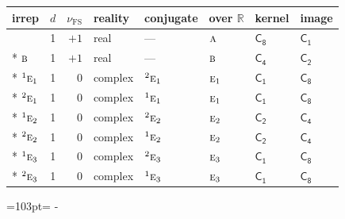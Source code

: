 \documentclass[10pt,a4paper]{article}
\newcommand{\needspace}[1]{\par\penalty-100\begingroup\dimen0=#1\relax\dimen2=\pagegoal
  \advance\dimen2-\pagetotal\ifdim\dimen0>\dimen2\relax\ifdim\dimen2>0pt\vfil\break\fi\fi
  \endgroup}
\numberwithin{equation}{section}
\newcommand{\grp}[1]{\mathsf{#1}}
\newcommand{\irr}[1]{\text{\normalfont\scshape #1}}
\newcommand{\conjpair}[1]{{}^{#1}}
\newcommand{\detbox}[1]{{\setlength{\fboxsep}{1pt}\fbox{#1}}}
\newcommand{\fsind}{\nu_{\mathrm{FS}}}
\begin{document}
{\small\renewcommand{\arraystretch}{1.25}\setlength{\tabcolsep}{4pt}\begin{longtable}{@{}lrrlllll@{}}\toprule
irrep & $d$ & $\fsind$ & reality & conjugate & over $\mathbb{R}$ & kernel & image\\\midrule\endhead
\bottomrule\endfoot\endlastfoot
\detbox{$\irr{a}$} & 1 & $+1$ & real & --- & $\irr{a}$ & \href{C8.pdf}{$\grp{C_{8}}$} & \href{C1.pdf}{$\grp{C_{1}}$}\\*
$\irr{b}$ & 1 & $+1$ & real & --- & $\irr{b}$ & \href{C4.pdf}{$\grp{C_{4}}$} & \href{C2.pdf}{$\grp{C_{2}}$}\\*
$\conjpair{1}\irr{e}_{1}$ & 1 & $0$ & complex & $\conjpair{2}\irr{e}_{1}$ & $\irr{e}_{1}$ & \href{C1.pdf}{$\grp{C_{1}}$} & \href{C8.pdf}{$\grp{C_{8}}$}\\*
$\conjpair{2}\irr{e}_{1}$ & 1 & $0$ & complex & $\conjpair{1}\irr{e}_{1}$ & $\irr{e}_{1}$ & \href{C1.pdf}{$\grp{C_{1}}$} & \href{C8.pdf}{$\grp{C_{8}}$}\\*
$\conjpair{1}\irr{e}_{2}$ & 1 & $0$ & complex & $\conjpair{2}\irr{e}_{2}$ & $\irr{e}_{2}$ & \href{C2.pdf}{$\grp{C_{2}}$} & \href{C4.pdf}{$\grp{C_{4}}$}\\*
$\conjpair{2}\irr{e}_{2}$ & 1 & $0$ & complex & $\conjpair{1}\irr{e}_{2}$ & $\irr{e}_{2}$ & \href{C2.pdf}{$\grp{C_{2}}$} & \href{C4.pdf}{$\grp{C_{4}}$}\\*
$\conjpair{1}\irr{e}_{3}$ & 1 & $0$ & complex & $\conjpair{2}\irr{e}_{3}$ & $\irr{e}_{3}$ & \href{C1.pdf}{$\grp{C_{1}}$} & \href{C8.pdf}{$\grp{C_{8}}$}\\*
$\conjpair{2}\irr{e}_{3}$ & 1 & $0$ & complex & $\conjpair{1}\irr{e}_{3}$ & $\irr{e}_{3}$ & \href{C1.pdf}{$\grp{C_{1}}$} & \href{C8.pdf}{$\grp{C_{8}}$}\\
\bottomrule\end{longtable}}
\needspace{103pt}
\end{document}
